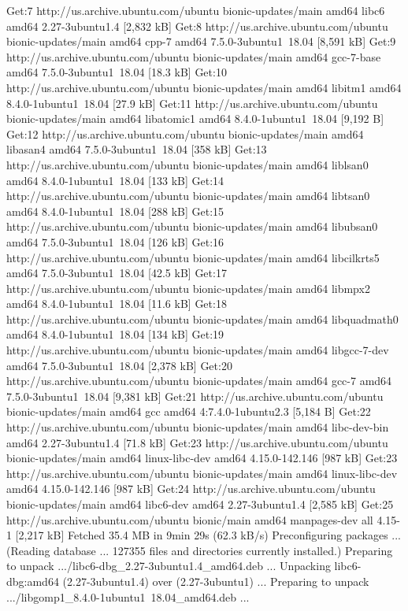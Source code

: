 Get:7 http://us.archive.ubuntu.com/ubuntu bionic-updates/main amd64 libc6 amd64 2.27-3ubuntu1.4 [2,832 kB]
Get:8 http://us.archive.ubuntu.com/ubuntu bionic-updates/main amd64 cpp-7 amd64 7.5.0-3ubuntu1~18.04 [8,591 kB]
Get:9 http://us.archive.ubuntu.com/ubuntu bionic-updates/main amd64 gcc-7-base amd64 7.5.0-3ubuntu1~18.04 [18.3 kB]
Get:10 http://us.archive.ubuntu.com/ubuntu bionic-updates/main amd64 libitm1 amd64 8.4.0-1ubuntu1~18.04 [27.9 kB]
Get:11 http://us.archive.ubuntu.com/ubuntu bionic-updates/main amd64 libatomic1 amd64 8.4.0-1ubuntu1~18.04 [9,192 B]
Get:12 http://us.archive.ubuntu.com/ubuntu bionic-updates/main amd64 libasan4 amd64 7.5.0-3ubuntu1~18.04 [358 kB]
Get:13 http://us.archive.ubuntu.com/ubuntu bionic-updates/main amd64 liblsan0 amd64 8.4.0-1ubuntu1~18.04 [133 kB]
Get:14 http://us.archive.ubuntu.com/ubuntu bionic-updates/main amd64 libtsan0 amd64 8.4.0-1ubuntu1~18.04 [288 kB]
Get:15 http://us.archive.ubuntu.com/ubuntu bionic-updates/main amd64 libubsan0 amd64 7.5.0-3ubuntu1~18.04 [126 kB]
Get:16 http://us.archive.ubuntu.com/ubuntu bionic-updates/main amd64 libcilkrts5 amd64 7.5.0-3ubuntu1~18.04 [42.5 kB]
Get:17 http://us.archive.ubuntu.com/ubuntu bionic-updates/main amd64 libmpx2 amd64 8.4.0-1ubuntu1~18.04 [11.6 kB]
Get:18 http://us.archive.ubuntu.com/ubuntu bionic-updates/main amd64 libquadmath0 amd64 8.4.0-1ubuntu1~18.04 [134 kB]
Get:19 http://us.archive.ubuntu.com/ubuntu bionic-updates/main amd64 libgcc-7-dev amd64 7.5.0-3ubuntu1~18.04 [2,378 kB]
Get:20 http://us.archive.ubuntu.com/ubuntu bionic-updates/main amd64 gcc-7 amd64 7.5.0-3ubuntu1~18.04 [9,381 kB]
Get:21 http://us.archive.ubuntu.com/ubuntu bionic-updates/main amd64 gcc amd64 4:7.4.0-1ubuntu2.3 [5,184 B]
Get:22 http://us.archive.ubuntu.com/ubuntu bionic-updates/main amd64 libc-dev-bin amd64 2.27-3ubuntu1.4 [71.8 kB]
Get:23 http://us.archive.ubuntu.com/ubuntu bionic-updates/main amd64 linux-libc-dev amd64 4.15.0-142.146 [987 kB]
Get:23 http://us.archive.ubuntu.com/ubuntu bionic-updates/main amd64 linux-libc-dev amd64 4.15.0-142.146 [987 kB]
Get:24 http://us.archive.ubuntu.com/ubuntu bionic-updates/main amd64 libc6-dev amd64 2.27-3ubuntu1.4 [2,585 kB]
Get:25 http://us.archive.ubuntu.com/ubuntu bionic/main amd64 manpages-dev all 4.15-1 [2,217 kB]
Fetched 35.4 MB in 9min 29s (62.3 kB/s)                                       
Preconfiguring packages ...
(Reading database ... 127355 files and directories currently installed.)
Preparing to unpack .../libc6-dbg_2.27-3ubuntu1.4_amd64.deb ...
Unpacking libc6-dbg:amd64 (2.27-3ubuntu1.4) over (2.27-3ubuntu1) ...
Preparing to unpack .../libgomp1_8.4.0-1ubuntu1~18.04_amd64.deb ...

